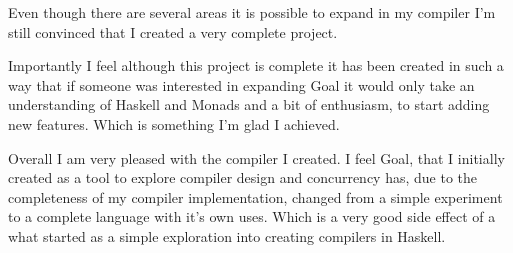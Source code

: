 Even though there are several areas it is possible to expand in my compiler I'm still convinced that I created a very complete project. 

Importantly I feel although this project is complete it has been created in such a way that if someone was interested in expanding Goal it would only take an understanding of Haskell and Monads and a bit of enthusiasm, to start adding new features. Which is something I'm glad I achieved. 

Overall I am very pleased with the compiler I created. I feel Goal, that I initially created as a tool to explore compiler design and concurrency has, due to the completeness of my compiler implementation, changed from a simple experiment to a complete language with it's own uses. Which is a very good side effect of a what started as a simple exploration into creating compilers in Haskell. 

